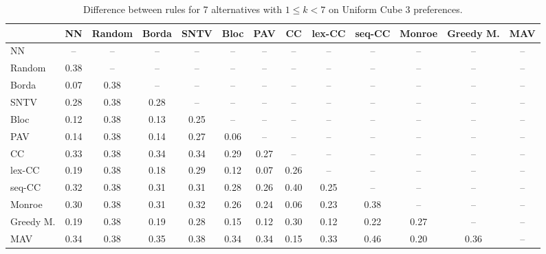 
\begin{table*}[h!]
\centering
\begin{tabular}{lcccccccccccc}
\toprule
 & NN & Random & Borda & SNTV & Bloc & PAV & CC & lex-CC & seq-CC & Monroe & Greedy M. & MAV \\
\midrule
NN & -- & -- & -- & -- & -- & -- & -- & -- & -- & -- & -- & -- \\
Random & 0.38 & -- & -- & -- & -- & -- & -- & -- & -- & -- & -- & -- \\
Borda & 0.07 & 0.38 & -- & -- & -- & -- & -- & -- & -- & -- & -- & -- \\
SNTV & 0.28 & 0.38 & 0.28 & -- & -- & -- & -- & -- & -- & -- & -- & -- \\
Bloc & 0.12 & 0.38 & 0.13 & 0.25 & -- & -- & -- & -- & -- & -- & -- & -- \\
PAV & 0.14 & 0.38 & 0.14 & 0.27 & 0.06 & -- & -- & -- & -- & -- & -- & -- \\
CC & 0.33 & 0.38 & 0.34 & 0.34 & 0.29 & 0.27 & -- & -- & -- & -- & -- & -- \\
lex-CC & 0.19 & 0.38 & 0.18 & 0.29 & 0.12 & 0.07 & 0.26 & -- & -- & -- & -- & -- \\
seq-CC & 0.32 & 0.38 & 0.31 & 0.31 & 0.28 & 0.26 & 0.40 & 0.25 & -- & -- & -- & -- \\
Monroe & 0.30 & 0.38 & 0.31 & 0.32 & 0.26 & 0.24 & 0.06 & 0.23 & 0.38 & -- & -- & -- \\
Greedy M. & 0.19 & 0.38 & 0.19 & 0.28 & 0.15 & 0.12 & 0.30 & 0.12 & 0.22 & 0.27 & -- & -- \\
MAV & 0.34 & 0.38 & 0.35 & 0.38 & 0.34 & 0.34 & 0.15 & 0.33 & 0.46 & 0.20 & 0.36 & -- \\
\bottomrule
\end{tabular}

\caption{Difference between rules for 7 alternatives with $1 \leq k < 7$ on Uniform Cube 3 preferences.}
\end{table*}
